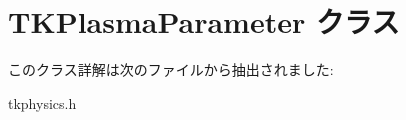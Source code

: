 \hypertarget{class_t_k_plasma_parameter}{}\section{T\+K\+Plasma\+Parameter クラス}
\label{class_t_k_plasma_parameter}


このクラス詳解は次のファイルから抽出されました\+:\begin{DoxyCompactItemize}
\item 
tkphysics.\+h\end{DoxyCompactItemize}
